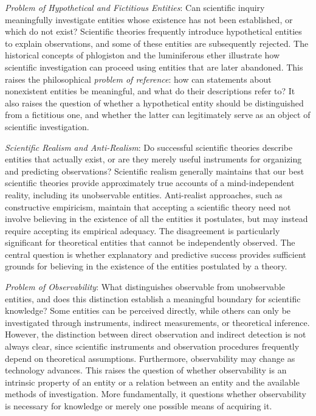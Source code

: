 \emph{Problem of Hypothetical and Fictitious Entities}: Can scientific inquiry meaningfully investigate entities whose existence has not been established, or which do not exist? Scientific theories frequently introduce hypothetical entities to explain observations, and some of these entities are subsequently rejected. The historical concepts of phlogiston and the luminiferous ether illustrate how scientific investigation can proceed using entities that are later abandoned. This raises the philosophical \emph{problem of reference}: how can statements about nonexistent entities be meaningful, and what do their descriptions refer to? It also raises the question of whether a hypothetical entity should be distinguished from a fictitious one, and whether the latter can legitimately serve as an object of scientific investigation.

\emph{Scientific Realism and Anti-Realism}: Do successful scientific theories describe entities that actually exist, or are they merely useful instruments for organizing and predicting observations? Scientific realism generally maintains that our best scientific theories provide approximately true accounts of a mind-independent reality, including its unobservable entities. Anti-realist approaches, such as constructive empiricism, maintain that accepting a scientific theory need not involve believing in the existence of all the entities it postulates, but may instead require accepting its empirical adequacy. The disagreement is particularly significant for theoretical entities that cannot be independently observed. The central question is whether explanatory and predictive success provides sufficient grounds for believing in the existence of the entities postulated by a theory.

\emph{Problem of Observability}: What distinguishes observable from unobservable entities, and does this distinction establish a meaningful boundary for scientific knowledge? Some entities can be perceived directly, while others can only be investigated through instruments, indirect measurements, or theoretical inference. However, the distinction between direct observation and indirect detection is not always clear, since scientific instruments and observation procedures frequently depend on theoretical assumptions. Furthermore, observability may change as technology advances. This raises the question of whether observability is an intrinsic property of an entity or a relation between an entity and the available methods of investigation. More fundamentally, it questions whether observability is necessary for knowledge or merely one possible means of acquiring it.

